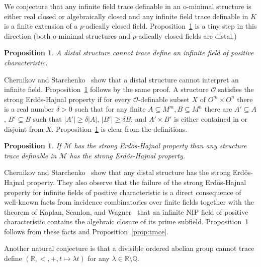 \documentclass[bibalpha]{amsart}
\newtheorem{prop}[theorem]{Proposition}
\theoremstyle{definition}
\theoremstyle{remark}
\newcommand{\nip}{\mathrm{NIP}}
\newcommand{\Sa}[1]{\ensuremath{\mathscr{#1}}}
\newcommand{\Q}{\mathbb{Q}}
\newcommand{\R}{\mathbb{R}}
\begin{document}
\noindent
We conjecture that any infinite field trace definable in an o-minimal structure is either real closed or algebraically closed and any infinite field trace definable in $K$ is a finite extension of a $p$-adically closed field.
Proposition~\ref{prop:trace-distal} is a tiny step in this direction (both o-minimal structures and $p$-adically closed fields are distal.)

\begin{prop}
\label{prop:trace-distal}
A distal structure cannot trace define an infinite field of positive characteristic.
\end{prop}

\noindent
Chernikov and Starchenko~\cite{CS} show that a distal structure cannot interpret an infinite field.
Proposition~\ref{prop:trace-distal} follows by the same proof.
A structure $\Sa O$ satisfies the strong Erd\"os-Hajnal property if for every $\Sa O$-definable subset $X$ of $O^m \times O^n$ there is a real number $\delta > 0$ such that for any finite $A \subseteq M^m, B \subseteq M^n$ there are $A' \subseteq A$, $B' \subseteq B$ such that $|A'| \geq \delta |A|$, $|B'| \geq \delta B$, and $A' \times B'$ is either contained in or disjoint from $X$.
Proposition~\ref{prop:eh-trace} is clear from the definitions.

\begin{prop}
\label{prop:eh-trace}
If $\Sa M$ has the strong Erd\"os-Hajnal property than any structure trace definable in $\Sa M$ has the strong Erd\"os-Hajnal property.
\end{prop}

\noindent
Chernikov and Starchenko~\cite{CS} show that any distal structure has the strong Erd\"os-Hajnal property.
They also observe that the failure of the strong Erd\"os-Hajnal property for infinite fields of positive characteristic is a direct consequence of well-known facts from incidence combinatorics over finite fields together with the theorem of Kaplan, Scanlon, and Wagner~\cite{Kaplan2011} that an infinite $\nip$ field of positive characteristic contains the algebraic closure of its prime subfield.
Proposition~\ref{prop:trace-distal} follows from these facts and Proposition~\ref{prop:trace}.
\newline

\noindent
Another natural conjecture is that a divisible ordered abelian group cannot trace define $(\R,<,+,t \mapsto \lambda t)$ for any $\lambda \in \R \setminus \Q$.
\end{document}
